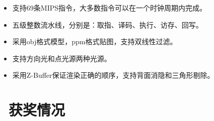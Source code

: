 \documentclass{resume}
\begin{document}
\begin{itemize}
  \item 支持69条MIPS指令，大多数指令可以在一个时钟周期内完成。
  \item 五级整数流水线，分别是：取指、译码、执行、访存、回写。
\end{itemize}


\begin{itemize}
  \item 采用obj格式模型，ppm格式贴图，支持双线性过滤。
  \item 支持方向光和点光源两种光源。
  \item 采用Z-Buffer保证渲染正确的顺序，支持背面消隐和三角形剔除。
\end{itemize}

\section{\texorpdfstring{\faHeartO\ 获奖情况}{获奖情况}}


%
%
\end{document}
